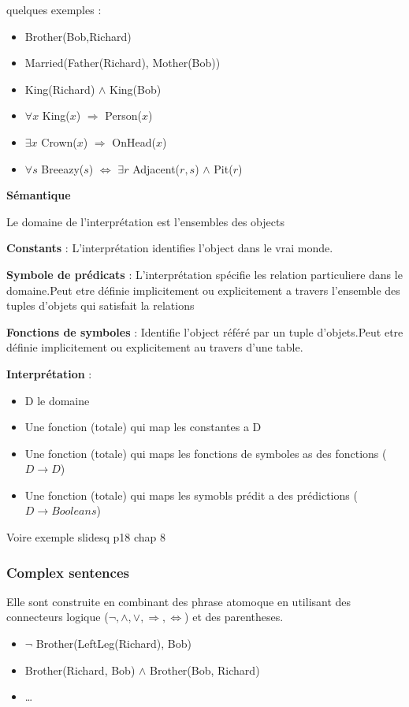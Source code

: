 		quelques exemples :
		\begin{itemize}
			\item Brother(Bob,Richard)
			\item Married(Father(Richard), Mother(Bob))
			\item King(Richard) $\land$ King(Bob)
			\item $\forall x$ King($x$) $\Rightarrow$ Person($x$)
			\item $\exists x$ Crown($x$) $\Rightarrow$ OnHead($x$)
			\item $\forall s$ Breeazy($s$) $\Leftrightarrow$ $\exists r$ Adjacent($r,s$) $\land$ Pit($r$) 
		\end{itemize}
		
		\textbf{Sémantique}
		
			Le domaine de l'interprétation est l'ensembles des objects
			
			\textbf{Constants} : L'interprétation identifies l'object dans le vrai monde.
			
			\textbf{Symbole de prédicats} : L'interprétation spécifie les relation particuliere dans le domaine.Peut etre définie implicitement ou explicitement a travers l'ensemble des tuples d'objets qui satisfait la relations
			
			
			\textbf{Fonctions de symboles} : Identifie l'object référé par un tuple d'objets.Peut etre définie implicitement ou explicitement au travers d'une table.
			
		
		\textbf{Interprétation} : 
		\begin{itemize}
			\item D le domaine
			\item Une fonction (totale) qui map les constantes a D
			\item Une fonction (totale) qui maps les fonctions de symboles as des fonctions ($D \rightarrow D$)
			\item Une fonction (totale) qui maps les symobls prédit a des prédictions ($D \rightarrow Booleans$)
		\end{itemize}
		
		Voire exemple slidesq p18 chap 8
		
		\subsubsection{Complex sentences}
			Elle sont construite en combinant des phrase atomoque en utilisant des connecteurs logique ($\neg, \land, \lor, \Rightarrow, \Leftrightarrow$) et des parentheses.
			\begin{itemize}
				\item $ \neg$ Brother(LeftLeg(Richard), Bob)
				\item Brother(Richard, Bob) $\land$ Brother(Bob, Richard)
				\item \dots
			\end{itemize}
			
